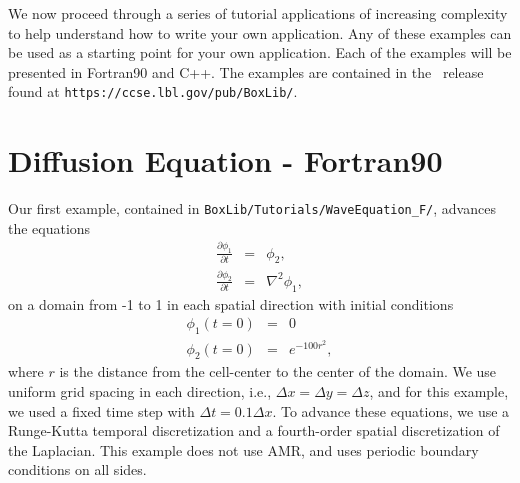 We now proceed through a series of tutorial applications of increasing complexity
to help understand how to write your own application.  Any of these examples
can be used as a starting point for your own application.  Each of the examples
will be presented in Fortran90 and C++.  The examples are contained in the \BoxLib\
release found at {\tt https://ccse.lbl.gov/pub/BoxLib/}.

\section{Diffusion Equation - Fortran90}
Our first example, contained in {\tt BoxLib/Tutorials/WaveEquation\_F/}, advances the 
equations
\begin{eqnarray}
\frac{\partial\phi_1}{\partial t} &=& \phi_2, \\
\frac{\partial\phi_2}{\partial t} &=& \nabla^2\phi_1,
\end{eqnarray}
on a domain from -1 to 1 in each spatial direction with initial conditions
\begin{eqnarray}
\phi_1(t=0) &=& 0 \\
\phi_2(t=0) &=& e^{-100r^2},
\end{eqnarray}
where $r$ is the distance from the cell-center to the center of the domain.
We use uniform grid spacing in each direction, i.e., $\Delta x = \Delta y = \Delta z$,
and for this example, we used a fixed time step with $\Delta t = 0.1\Delta x$.
To advance these equations, we use a Runge-Kutta temporal discretization and a 
fourth-order spatial discretization of the Laplacian.  This example does not use AMR, 
and uses periodic boundary conditions on all sides.

